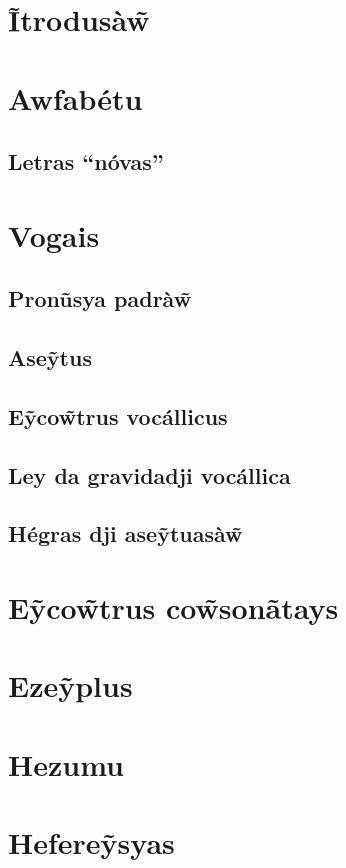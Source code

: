 \documentclass[12pt, a4paper]{article}
\begin{document}
\begin{bilingualpages}
    \leftpage
    \section{Ĩtrodusà\~{w}}
    
    \newpage
    \section{Awfabétu}
    \BrTableAbc

    \subsection{Letras ``nóvas''}
    
    \section{Vogais}
    \subsection{Pronũsya padrà\~w}
    \subsection{Ase\~ytus}
    \subsection{E\~yco\~wtrus vocállicus}
    \subsection{Ley da gravidadji vocállica}
    \subsection{Hégras dji ase\~ytuasà\~w}

    \section{E\~yco\~wtrus co\~wsonãtays}

    \section{Eze\~yplus}
    
\end{bilingualpages}

\newpage
\section{Hezumu}

\newpage
\section{Hefere\~ysyas}
\end{document}

